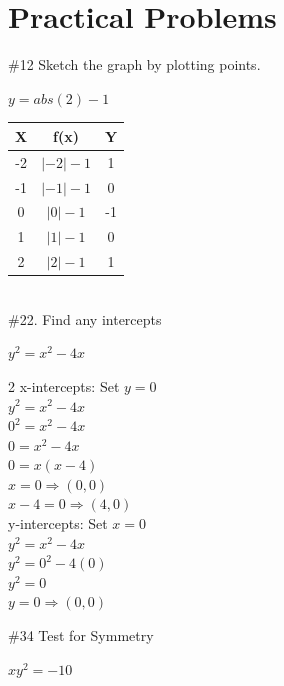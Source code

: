 \documentclass{article}
\begin{document}
	\pagebreak
	\section{Practical Problems}
	
	\#12 Sketch the graph by plotting points.
	
	\begin{center}
		$y=abs(2)-1$
	\end{center}
	
	\begin{tabular}{c|c|c}
		\hline
		X & f(x) & Y
		\\
		\hline
		-2 & $|-2|-1$ & 1
		\\
		-1 & $|-1|-1$ & 0
		\\
		0 & $|0|-1$ & -1
		\\
		1 & $|1|-1$ & 0
		\\
		2 & $|2|-1$ & 1
	\end{tabular}
	\\
	\#22. Find any intercepts
	\newline
	\begin{center}
		$y^2=x^2-4x$
	\end{center}
	\begin{multicols*}{2}
		x-intercepts: Set $y=0$
		\\
		$y^2 = x^2 - 4x$
		\\
		$0^2 = x^2 - 4x$
		\\
		$0 = x^2 - 4x$
		\\
		$0 = x(x-4)$
		\\
		$x=0 \Rightarrow (0,0)$
		\\
		$x-4=0 \Rightarrow (4,0)$
		\\

		\columnbreak
		y-intercepts: Set $x=0$
		\\
		$y^2 = x^2 - 4x$
		\\
		$y^2 = 0^2 - 4(0)$
		\\
		$y^2 = 0$
		\\
		$y=0 \Rightarrow (0,0)$
		\\
	\end{multicols*}
	\#34 Test for Symmetry
	\\
	\begin{center}
		$xy^2=-10$
	\end{center}
\end{document}
